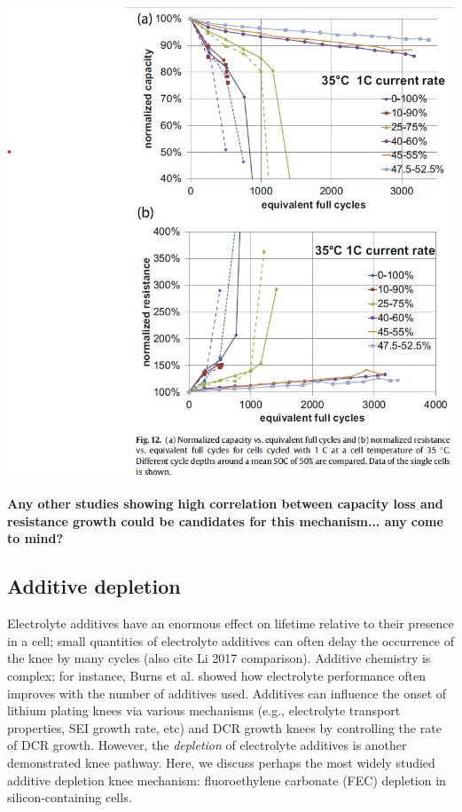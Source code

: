 \documentclass{article}
\begin{document}
\hfil\includegraphics[scale=0.5]{images/Ecker_2014_fig12.jpg}


\textbf{Any other studies showing high correlation between capacity loss and resistance growth could be candidates for this mechanism... any come to mind?}

\subsection{Additive depletion}

Electrolyte additives have an enormous effect on lifetime relative to their presence in a cell; small quantities of electrolyte additives can often delay the occurrence of the knee by many cycles\cite{ma_editors_2019} (also cite Li 2017 comparison). Additive chemistry is complex; for instance, Burns et al.\cite{burns_predicting_2013} showed how electrolyte performance often improves with the number of additives used. Additives can influence the onset of lithium plating knees via various mechanisms (e.g., electrolyte transport properties, SEI growth rate, etc) and DCR growth knees by controlling the rate of DCR growth\cite{ma_editors_2019}. However, the \emph{depletion} of electrolyte additives is another demonstrated knee pathway. Here, we discuss perhaps the most widely studied additive depletion knee mechanism: fluoroethylene carbonate (FEC) depletion in silicon-containing cells.
\end{document}
